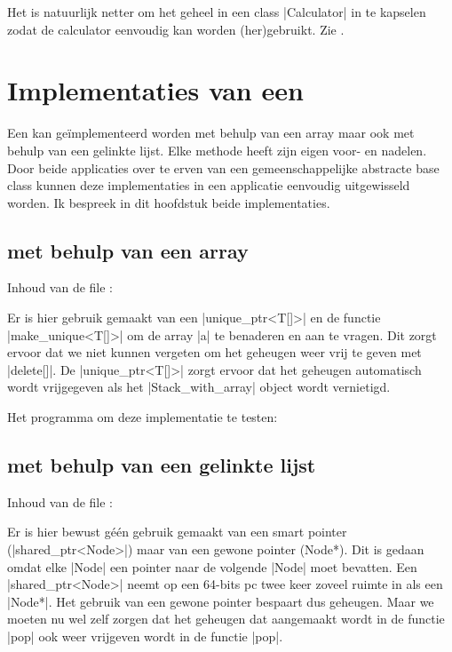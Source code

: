\begin{cpplstShortInline}
Het is natuurlijk netter om het geheel in een class |Calculator| in te kapselen zodat de calculator eenvoudig kan worden (her)gebruikt.
Zie .

\chapter{Implementaties van een }
\label{sec:VoorbeeldenImpl}
Een  kan geïmplementeerd worden met behulp van een array maar ook met behulp van een gelinkte lijst.
Elke methode heeft zijn eigen voor- en nadelen.
Door beide applicaties over te erven van een gemeenschappelijke abstracte base class kunnen deze implementaties in een applicatie eenvoudig uitgewisseld worden.
Ik bespreek in dit hoofdstuk beide implementaties.

\section{ met behulp van een array}
\label{sec:stackarray}

Inhoud van de file :


Er is hier gebruik gemaakt van een |unique_ptr<T[]>| en de functie |make_unique<T[]>| om de array |a| te benaderen en aan te vragen.
Dit zorgt ervoor dat we niet kunnen vergeten om het geheugen weer vrij te geven met |delete[]|.
De |unique_ptr<T[]>| zorgt ervoor dat het geheugen automatisch wordt vrijgegeven als het |Stack_with_array| object wordt vernietigd.

Het programma  om deze implementatie te testen:


\section{ met behulp van een gelinkte lijst}
Inhoud van de file :


Er is hier bewust géén gebruik gemaakt van een smart pointer (|shared_ptr<Node>|) maar van een gewone pointer (Node*).
Dit is gedaan omdat elke |Node| een pointer naar de volgende |Node| moet bevatten.
Een |shared_ptr<Node>| neemt op een 64-bits pc twee keer zoveel ruimte in als een |Node*|.
Het gebruik van een gewone pointer bespaart dus geheugen.
Maar we moeten nu wel zelf zorgen dat het geheugen dat aangemaakt wordt in de functie |pop| ook weer vrijgeven wordt in de functie |pop|.


\end{cpplstShortInline}
